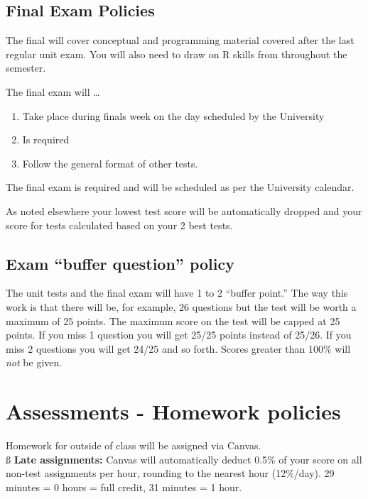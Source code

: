 \documentclass[
]{book}
\providecommand{\tightlist}{%
  \setlength{\itemsep}{0pt}\setlength{\parskip}{0pt}}
\begin{document}
\hypertarget{final-exam-policies}{%
\section{Final Exam Policies}\label{final-exam-policies}}

The final will cover conceptual and programming material covered after the last regular unit exam. You will also need to draw on R skills from throughout the semester.

The final exam will \ldots{}

\begin{enumerate}
\def\labelenumi{\arabic{enumi}.}
\tightlist
\item
  Take place during finals week on the day scheduled by the University
\item
  Is required
\item
  Follow the general format of other tests.
\end{enumerate}

The final exam is required and will be scheduled as per the University calendar.

As noted elsewhere your lowest test score will be automatically dropped and your score for tests calculated based on your 2 best tests.

\hypertarget{exam-buffer-question-policy}{%
\section{Exam ``buffer question'' policy}\label{exam-buffer-question-policy}}

The unit tests and the final exam will have 1 to 2 ``buffer point.'' The way this work is that there will be, for example, 26 questions but the test will be worth a maximum of 25 points. The maximum score on the test will be capped at 25 points. If you miss 1 question you will get 25/25 points instead of 25/26. If you miss 2 questions you will get 24/25 and so forth. Scores greater than 100\% will \emph{not} be given.

\hypertarget{homework}{%
\chapter{Assessments - Homework policies}\label{homework}}

Homework for outside of class will be assigned via Canvas.\\
ß
\textbf{Late assignments:} Canvas will automatically deduct 0.5\% of your score on all non-test assignments per hour, rounding to the nearest hour (12\%/day). 29 minutes = 0 hours = full credit, 31 minutes = 1 hour.
\end{document}
